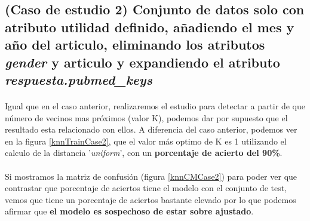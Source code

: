 \subsection{(Caso de estudio 2) Conjunto de datos solo con atributo utilidad definido, añadiendo el mes y año del articulo, eliminando los atributos \textit{gender} y articulo y expandiendo el atributo \textit{respuesta.pubmed\_keys}}

\paragraph{}
Igual que en el caso anterior, realizaremos el estudio para detectar a partir de que número de vecinos mas próximos (valor K), podemos dar por supuesto que el resultado esta relacionado con ellos. A diferencia del caso anterior, podemos ver en la figura \ref{knnTrainCase2}, que el valor más optimo de K es 1 utilizando el calculo de la distancia '\textit{uniform}', con un \textbf{porcentaje de acierto del 90\%}.

\paragraph{}
Si mostramos la matriz de confusión (figura \ref{knnCMCase2}) para poder ver que contrastar que porcentaje de aciertos tiene el modelo con el conjunto de test, vemos que tiene un porcentaje de aciertos bastante elevado por lo que podemos afirmar que \textbf{el modelo es sospechoso de estar sobre ajustado\cite{ref:knn_overfiting}}.

